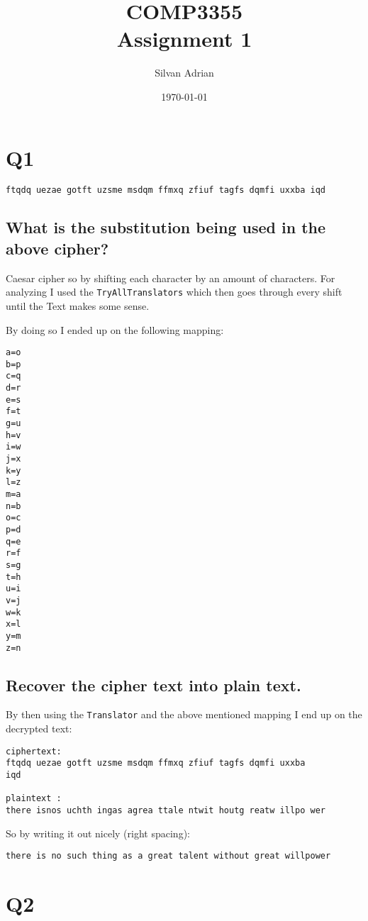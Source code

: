 \documentclass{article}
\title{COMP3355 \\Assignment 1}
\author{Silvan Adrian}
\date{\today}
\begin{document}
\maketitle

\section{Q1}


\begin{verbatim}
ftqdq uezae gotft uzsme msdqm ffmxq zfiuf tagfs dqmfi uxxba iqd
\end{verbatim}

\subsection{What is the substitution being used in the above cipher?}

Caesar cipher so by shifting each character by an amount of characters.
For analyzing I used the \texttt{TryAllTranslators} which then goes through every shift until the Text makes some sense.

By doing so I ended up on the following mapping:
\begin{verbatim}
a=o
b=p
c=q
d=r
e=s
f=t
g=u
h=v
i=w
j=x
k=y
l=z
m=a
n=b
o=c
p=d
q=e
r=f
s=g
t=h
u=i
v=j
w=k
x=l
y=m
z=n
\end{verbatim}

\subsection{Recover the cipher text into plain text.}

By then using the \texttt{Translator} and the above mentioned mapping I end up on the decrypted text:
\begin{verbatim}
ciphertext:
ftqdq uezae gotft uzsme msdqm ffmxq zfiuf tagfs dqmfi uxxba 
iqd

plaintext :
there isnos uchth ingas agrea ttale ntwit houtg reatw illpo wer
\end{verbatim}

So by writing it out nicely (right spacing):
\begin{verbatim}
there is no such thing as a great talent without great willpower
\end{verbatim}


\section{Q2}
\end{document}
